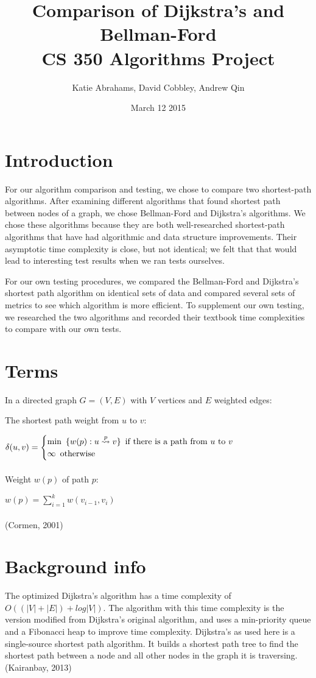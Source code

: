 \documentclass{article}
\title{Comparison of Dijkstra's and Bellman-Ford \\ CS 350 Algorithms Project}
\author{Katie Abrahams, David Cobbley, Andrew Qin}
\date{March 12 2015}
\begin{document}
\maketitle

\tableofcontents

\pagebreak

\section{Introduction}
For our algorithm comparison and testing, we chose to compare two shortest-path algorithms.  After examining different algorithms that found shortest path between nodes of a graph, we chose Bellman-Ford and Dijkstra's algorithms.  We chose these algorithms because they are both well-researched shortest-path algorithms that have had algorithmic and data structure improvements.  Their asymptotic time complexity is close, but not identical; we felt that that would lead to interesting test results when we ran tests ourselves.

For our own testing procedures, we compared the Bellman-Ford and Dijkstra's shortest path algorithm on identical sets of data and compared several sets of metrics to see which algorithm is more efficient.  To supplement our own testing, we researched the two algorithms and recorded their textbook time complexities to compare with our own tests.

\section{Terms}
In a directed graph $G=(V,E)$ with $V$ vertices and $E$ weighted edges:

The shortest path weight from $u$ to $v$:

$\delta(u,v) = \begin{cases}
\text{min} \hspace{5 pt} \{w(p):u\overset{p}{\leadsto}v\} \hspace{5 pt} \text{if there is a path from $u$ to $v$}\\
\infty \hspace{5 pt} \text{otherwise}
\end{cases}$
\\
\\
Weight $w(p)$ of path $p$:

$w(p)=\displaystyle\sum_{i=1}^{k} w(v_{i-1},v_{i})$
\\
\\
(Cormen, 2001)
\section{Background info}
The optimized Dijkstra's algorithm has a time complexity of $O((|V|+|E|)+log|V|)$.
The algorithm with this time complexity is the version modified from Dijkstra's original algorithm, and uses a min-priority queue and a Fibonacci heap to improve time complexity.  Dijkstra's as used here is a single-source shortest path algorithm.  It builds a shortest path tree to find the shortest path between a node and all other nodes in the graph it is traversing. (Kairanbay, 2013)
\end{document}
